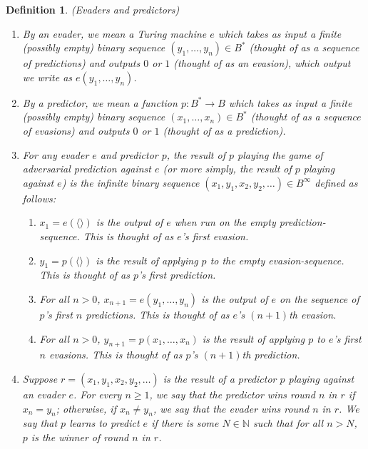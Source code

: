 \documentclass{article}
\newtheorem{definition}[theorem]{Definition}
\begin{document}
\begin{definition}
\label{evaderpredictordefn}
    (Evaders and predictors)
    \begin{enumerate}
        \item
        By an \emph{evader}, we mean a Turing machine $e$
        which takes as input a finite (possibly empty) binary sequence
        $(y_1,\ldots,y_n)\in B^*$
        (thought of as a sequence of \emph{predictions})
        and outputs $0$ or $1$ (thought of as an \emph{evasion}), which output
        we write as $e(y_1,\ldots,y_n)$.
        \item
        By a \emph{predictor}, we mean a function $p:B^*\to B$
        which takes as input a finite (possibly empty) binary sequence
        $(x_1,\ldots,x_n)\in B^*$
        (thought of as a sequence of \emph{evasions})
        and outputs $0$ or $1$ (thought of as a \emph{prediction}).
        \item
        For any evader $e$ and predictor $p$, the \emph{result of $p$ playing the
        game of adversarial prediction against $e$} (or more simply, the \emph{result of
        $p$ playing against $e$}) is the infinite binary sequence
        $(x_1,y_1,x_2,y_2,\ldots)\in B^\infty$
        defined as follows:
        \begin{enumerate}
            \item
            $x_1=e(\langle\rangle)$ is
            the output of $e$ when run on the empty prediction-sequence.
            This is thought of as $e$'s first evasion.
            \item
            $y_1=p(\langle\rangle)$ is
            the result of applying $p$ to the empty evasion-sequence.
            This is thought of as $p$'s first prediction.
            \item
            For all $n>0$,
            $x_{n+1}=e(y_1,\ldots,y_n)$ is
            the output of $e$ on the sequence of $p$'s first $n$ predictions.
            This is thought of as $e$'s $(n+1)$th evasion.
            \item
            For all $n>0$,
            $y_{n+1}=p(x_1,\ldots,x_n)$ is
            the result of applying $p$ to $e$'s first $n$ evasions.
            This is thought of as $p$'s $(n+1)$th prediction.
        \end{enumerate}
        \item
        Suppose $r=(x_1,y_1,x_2,y_2,\ldots)$ is the result of a predictor $p$ playing
        against an evader $e$. For every $n\geq 1$,
        we say that \emph{the predictor wins round $n$ in $r$}
        if $x_n=y_n$; otherwise, if $x_n\neq y_n$, we say that
        \emph{the evader wins round $n$ in $r$}.
        We say that \emph{$p$ learns to predict $e$} if there is some $N\in\mathbb N$
        such that for all $n>N$, $p$ is the winner of round $n$ in $r$.
    \end{enumerate}
\end{definition}
\end{document}
